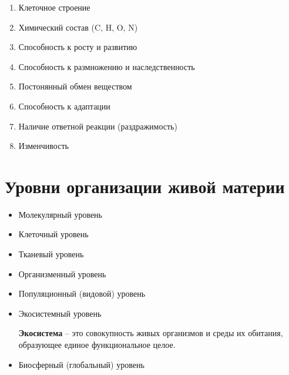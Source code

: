 \begin{enumerate}
    \item Клеточное строение
    \item Химический состав (C, H, O, N)
    \item Способность к росту и развитию
    \item Способность к размножению и наследственность
    \item Постонянный обмен веществом
    \item Способность к адаптации
    \item Наличие ответной реакции (раздражимость)
    \item Изменчивость
\end{enumerate}

\section{Уровни организации живой материи}

\begin{itemize}
    \item Молекулярный уровень
    \item Клеточный уровень
    \item Тканевый уровень
    \item Организменный уровень
    \item Популяционный (видовой) уровень
    \item Экосистемный уровень

        \textbf{Экосистема} -- это совокупность живых организмов
        и среды их обитания, образующее единое функциональное целое.

    \item Биосферный (глобальный) уровень
\end{itemize}
